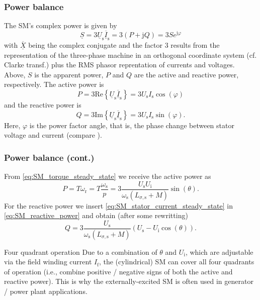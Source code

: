 \begin{frame}
	\frametitle{Power balance} 
	The SM's complex power is given by 
	\begin{equation}
			\underline{S}= 3\underline{U}_\mathrm{s} \overline{\underline{I}}_\mathrm{s} =  3(P + \mathrm{j}Q) = 3S e^{\mathrm{j}\varphi} 
	\end{equation}
	with $\overline{\underline{X}}$ being the complex conjugate and the factor $3$ results from the representation of the three-phase machine in an orthogonal coordinate system (cf. Clarke transf.) plus the RMS phasor reprentation of currents and voltages. \pause Above, $S$ is the apparent power, $P$ and $Q$ are the active and reactive power, respectively. \pause The active power is
	\begin{equation}
		P = 3\mathrm{Re}\left\{ \underline{U}_\mathrm{s} \overline{\underline{I}}_\mathrm{s}\right\} = 3 U_\mathrm{s} I_\mathrm{s} \cos(\varphi)
	\end{equation}
	\pause
	and the reactive power is
	\begin{equation}
		Q = 3\mathrm{Im}\left\{\underline{U}_\mathrm{s} \overline{\underline{I}}_\mathrm{s}\right\} = 3 U_\mathrm{s} I_\mathrm{s} \sin(\varphi).
		\label{eq:SM_reactive_power}
	\end{equation}
	\pause
	Here, $\varphi$ is the power factor angle, that is, the phase change between stator voltage and current (compare ). 
\end{frame}

\begin{frame}
	\frametitle{Power balance (cont.)} 
	From \eqref{eq:SM_torque_steady_state} we receive the active power as
	\begin{equation}
		P = T \omega_\mathrm{r} = T \frac{\omega_\mathrm{s}}{p} = 3 \frac{U_\mathrm{s} U_\mathrm{i}}{\omega_\mathrm{s} \left(L_{\sigma,\mathrm{s}} + M\right)}  \sin(\theta).
	\end{equation} 
	\pause
	For the reactive power we insert \eqref{eq:SM_stator_current_steady_state} in \eqref{eq:SM_reactive_power} and obtain (after some rewritting)
	\begin{equation}
		Q = 3 \frac{U_\mathrm{s}}{\omega_\mathrm{s} \left(L_{\sigma,\mathrm{s}} + M\right)} \left(U_\mathrm{s} - U_\mathrm{i} \cos(\theta) \right).
	\end{equation}
	\pause
	\begin{varblock}{Four quadrant operation}
		Due to a combination of $\theta$ and $U_\mathrm{i}$, which are adjustable via the field winding current $I_\mathrm{f}$, the (cylindrical) SM can cover all four quadrants of operation (i.e., combine positive / negative signs of both the active and reactive power). This is why the externally-excited SM is often used in generator / power plant applications. 
	\end{varblock}
\end{frame}

